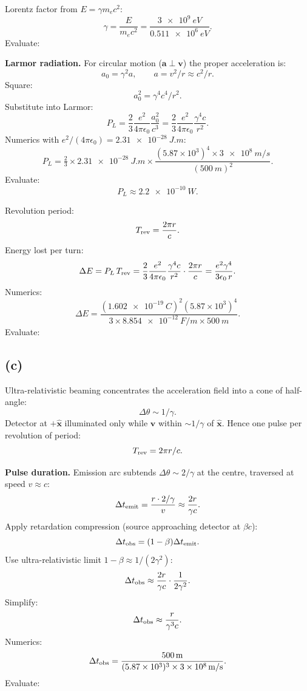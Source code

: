 \documentclass[11pt]{article}
\begin{document}
Lorentz factor from $E = \gamma m_e c^2$:
\[ \gamma = \frac{E}{m_ec^2} = \frac{\SI{3e9}{eV}}{\SI{0.511e6}{eV}}. \]
Evaluate:

\textbf{Larmor radiation.} For circular motion ($\bm a\perp\bm v$) the proper acceleration is:
\[ a_0 = \gamma^2 a,\qquad a = v^2/r \approx c^2/r. \]
Square:
\[ a_0^2 = \gamma^4 c^4/r^2. \]
Substitute into Larmor:
\[ P_L = \frac{2}{3}\frac{e^2}{4\pi\epsilon_0}\frac{a_0^2}{c^3} = \frac{2}{3}\frac{e^2}{4\pi\epsilon_0}\frac{\gamma^4 c}{r^2}. \]
Numerics with $e^2/(4\pi\epsilon_0)=\SI{2.31e-28}{J.m}$:
\[ P_L = \tfrac{2}{3}\times\SI{2.31e-28}{J.m}\times\frac{(5.87\times 10^3)^4\times \SI{3e8}{m/s}}{(\SI{500}{m})^2}. \]
Evaluate:
\[ P_L \approx \SI{2.2e-10}{W}. \]

Revolution period:
\[ T_{\rm rev} = \frac{2\pi r}{c}. \]
Energy lost per turn:
\[ \Delta E = P_L\,T_{\rm rev} = \frac{2}{3}\frac{e^2}{4\pi\epsilon_0}\frac{\gamma^4 c}{r^2}\cdot\frac{2\pi r}{c} = \frac{e^2 \gamma^4}{3\epsilon_0\,r}. \]
Numerics:
\[ \Delta E = \frac{(\SI{1.602e-19}{C})^2 (5.87\times 10^3)^4}{3\times\SI{8.854e-12}{F/m}\times\SI{500}{m}}. \]
Evaluate:

\subsection*{(c)}

Ultra-relativistic beaming concentrates the acceleration field into a cone of half-angle:
\[ \Delta\theta\sim 1/\gamma. \]
Detector at $+\hat{\bm x}$ illuminated only while $\bm v$ within $\sim 1/\gamma$ of $\hat{\bm x}$. Hence one pulse per revolution of period:
\[ T_{\rm rev} = 2\pi r/c. \]

\textbf{Pulse duration.} Emission arc subtends $\Delta\theta\sim 2/\gamma$ at the centre, traversed at speed $v\approx c$:
\[ \Delta t_{\rm emit} = \frac{r\cdot 2/\gamma}{v} \approx \frac{2r}{\gamma c}. \]
Apply retardation compression (source approaching detector at $\beta c$):
\[ \Delta t_{\rm obs} = (1-\beta)\Delta t_{\rm emit}. \]
Use ultra-relativistic limit $1-\beta\approx 1/(2\gamma^2)$:
\[ \Delta t_{\rm obs} \approx \frac{2r}{\gamma c}\cdot\frac{1}{2\gamma^2}. \]
Simplify:
\[ \Delta t_{\rm obs} \approx \frac{r}{\gamma^3 c}. \]
Numerics:
\[ \Delta t_{\rm obs} = \frac{\SI{500}{m}}{(5.87\times 10^3)^3 \times \SI{3e8}{m/s}}. \]
Evaluate:
\end{document}
